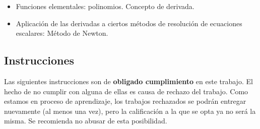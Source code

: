 \documentclass[12pt]{article}
\begin{document}
\begin{itemize}
  \item Funciones elementales: polinomios. Concepto de derivada.
  \item Aplicación de las derivadas a ciertos métodos de resolución de ecuaciones escalares: Método de Newton.
\end{itemize}

\subsection*{Instrucciones}

Las siguientes instrucciones son de \textbf{obligado cumplimiento} en este trabajo. El hecho de no cumplir con alguna de ellas es causa de rechazo del trabajo. Como estamos en proceso de aprendizaje, los trabajos rechazados se podrán entregar nuevamente (al menos una vez), pero la calificación a la que se opta ya no será la misma. Se recomienda no abusar de esta posibilidad.
\end{document}
